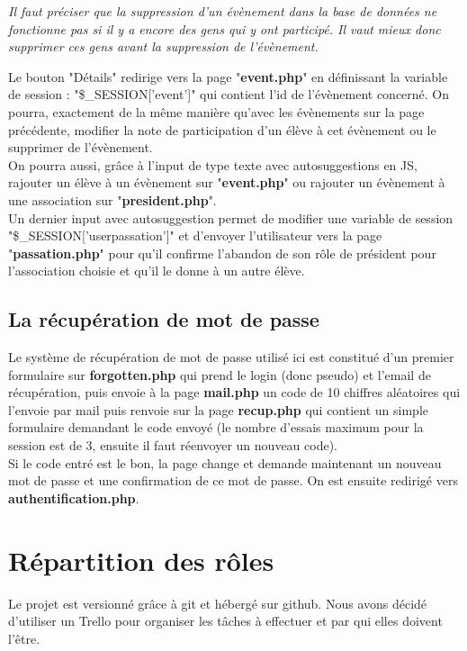 \documentclass[french]{article}
\begin{document}
	\textit{Il faut préciser que la suppression d'un évènement dans la base de données ne fonctionne pas si il y a encore des gens qui y ont participé. Il vaut mieux donc supprimer ces gens avant la suppression de l'évènement.\\}
	
	Le bouton "Détails" redirige vers la page "\textbf{event.php}" en définissant la variable de session : "\$\_SESSION['event']" qui contient l'id de l'évènement concerné. On pourra, exactement de la même manière qu'avec les évènements sur la page précédente, modifier la note de participation d'un élève à cet évènement ou le supprimer de l'évènement. \\
	
	On pourra aussi, grâce à l'input de type texte avec autosuggestions en JS, rajouter un élève à un évènement sur "\textbf{event.php}" ou rajouter un évènement à une association sur "\textbf{president.php}".\\
	
	Un dernier input avec autosuggestion permet de modifier une variable de session "\$\_SESSION['userpassation']" et d'envoyer l'utilisateur vers la page "\textbf{passation.php}" pour qu'il confirme l'abandon de son rôle de président pour l'association choisie et qu'il le donne à un autre élève.

\subsection{La récupération de mot de passe}
Le système de récupération de mot de passe utilisé ici est constitué d'un premier formulaire sur \textbf{forgotten.php} qui prend le login (donc pseudo) et l'email de récupération, puis envoie à la page \textbf{mail.php} un code de 10 chiffres aléatoires qui l'envoie par mail puis renvoie sur la page \textbf{recup.php} qui contient un simple formulaire demandant le code envoyé (le nombre d'essais maximum pour la session est de 3, ensuite il faut réenvoyer un nouveau code).\\

Si le code entré est le bon, la page change et demande maintenant un nouveau mot de passe et une confirmation de ce mot de passe. On est ensuite redirigé vers \textbf{authentification.php}. 

\section{Répartition des rôles}
Le projet est versionné grâce à git et hébergé sur github. Nous avons décidé d'utiliser un Trello pour organiser les tâches à effectuer et par qui elles doivent l'être.\\
\end{document}
